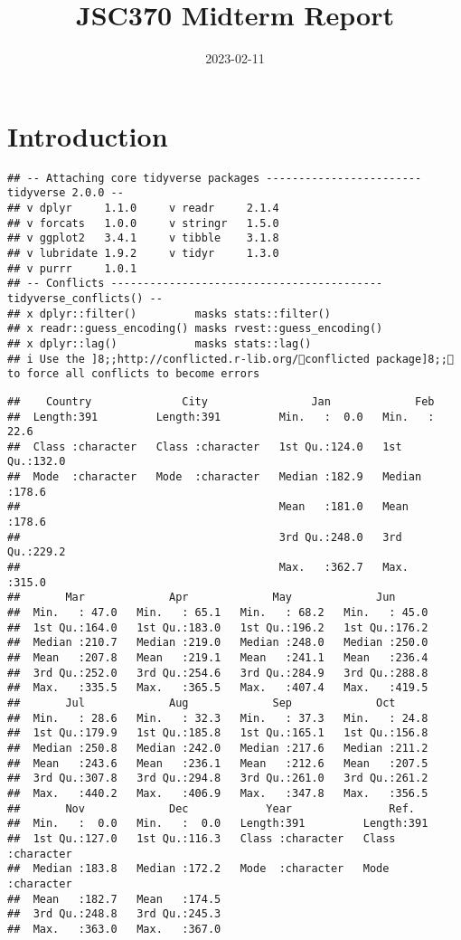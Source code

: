 \documentclass[
]{article}
\title{JSC370 Midterm Report}
\author{}
\date{\vspace{-2.5em}2023-02-11}
\begin{document}
\maketitle

\hypertarget{introduction}{%
\section{Introduction}\label{introduction}}

\begin{verbatim}
## -- Attaching core tidyverse packages ------------------------ tidyverse 2.0.0 --
## v dplyr     1.1.0     v readr     2.1.4
## v forcats   1.0.0     v stringr   1.5.0
## v ggplot2   3.4.1     v tibble    3.1.8
## v lubridate 1.9.2     v tidyr     1.3.0
## v purrr     1.0.1     
## -- Conflicts ------------------------------------------ tidyverse_conflicts() --
## x dplyr::filter()         masks stats::filter()
## x readr::guess_encoding() masks rvest::guess_encoding()
## x dplyr::lag()            masks stats::lag()
## i Use the ]8;;http://conflicted.r-lib.org/conflicted package]8;; to force all conflicts to become errors
\end{verbatim}

\begin{verbatim}
##    Country              City                Jan             Feb       
##  Length:391         Length:391         Min.   :  0.0   Min.   : 22.6  
##  Class :character   Class :character   1st Qu.:124.0   1st Qu.:132.0  
##  Mode  :character   Mode  :character   Median :182.9   Median :178.6  
##                                        Mean   :181.0   Mean   :178.6  
##                                        3rd Qu.:248.0   3rd Qu.:229.2  
##                                        Max.   :362.7   Max.   :315.0  
##       Mar             Apr             May             Jun       
##  Min.   : 47.0   Min.   : 65.1   Min.   : 68.2   Min.   : 45.0  
##  1st Qu.:164.0   1st Qu.:183.0   1st Qu.:196.2   1st Qu.:176.2  
##  Median :210.7   Median :219.0   Median :248.0   Median :250.0  
##  Mean   :207.8   Mean   :219.1   Mean   :241.1   Mean   :236.4  
##  3rd Qu.:252.0   3rd Qu.:254.6   3rd Qu.:284.9   3rd Qu.:288.8  
##  Max.   :335.5   Max.   :365.5   Max.   :407.4   Max.   :419.5  
##       Jul             Aug             Sep             Oct       
##  Min.   : 28.6   Min.   : 32.3   Min.   : 37.3   Min.   : 24.8  
##  1st Qu.:179.9   1st Qu.:185.8   1st Qu.:165.1   1st Qu.:156.8  
##  Median :250.8   Median :242.0   Median :217.6   Median :211.2  
##  Mean   :243.6   Mean   :236.1   Mean   :212.6   Mean   :207.5  
##  3rd Qu.:307.8   3rd Qu.:294.8   3rd Qu.:261.0   3rd Qu.:261.2  
##  Max.   :440.2   Max.   :406.9   Max.   :347.8   Max.   :356.5  
##       Nov             Dec            Year               Ref.          
##  Min.   :  0.0   Min.   :  0.0   Length:391         Length:391        
##  1st Qu.:127.0   1st Qu.:116.3   Class :character   Class :character  
##  Median :183.8   Median :172.2   Mode  :character   Mode  :character  
##  Mean   :182.7   Mean   :174.5                                        
##  3rd Qu.:248.8   3rd Qu.:245.3                                        
##  Max.   :363.0   Max.   :367.0
\end{verbatim}
\end{document}
